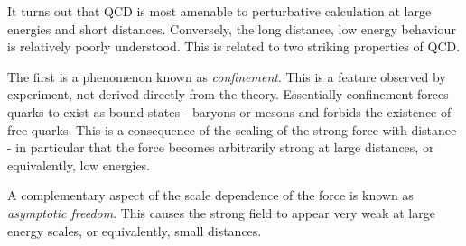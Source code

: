 It turns out that \ac{QCD} is most amenable to perturbative calculation at large
energies and short distances. Conversely, the long distance, low energy
behaviour is relatively poorly understood. This is related to two striking
properties of \ac{QCD}.

The first is a phenomenon known as \emph{confinement}. This is a feature
observed by experiment, not derived directly from the theory.  Essentially
confinement forces quarks to exist as bound states - baryons or mesons and
forbids the existence of free quarks.  This is a consequence of the scaling of
the strong force with distance - in particular that the force becomes
arbitrarily strong at large distances, or equivalently, low energies.

A complementary aspect of the scale dependence of the force is known as
\emph{asymptotic freedom}. This causes the strong field to appear very weak at
large energy scales, or equivalently, small distances.
